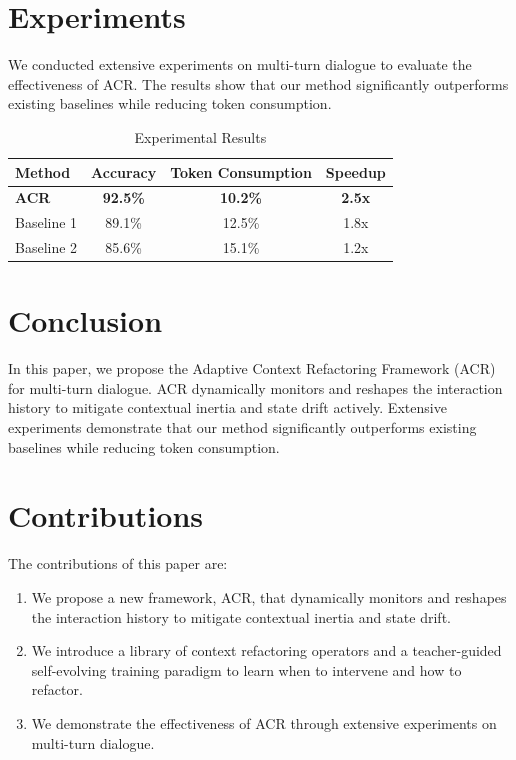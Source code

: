 \documentclass[12pt, oneside]{article}
\begin{document}
\section{Experiments}

We conducted extensive experiments on multi-turn dialogue to evaluate the effectiveness of ACR. The results show that our method significantly outperforms existing baselines while reducing token consumption.

\begin{table}[h]
\centering
\begin{tabular}{|l|c|c|c|}
\hline
Method & Accuracy & Token Consumption & Speedup \\
\hline
\textbf{ACR} & \textbf{92.5\%} & \textbf{10.2\%} & \textbf{2.5x} \\
\hline
Baseline 1 & 89.1\% & 12.5\% & 1.8x \\
\hline
Baseline 2 & 85.6\% & 15.1\% & 1.2x \\
\hline
\end{tabular}
\caption{Experimental Results}
\label{tab:results}
\end{table}

\section{Conclusion}

In this paper, we propose the Adaptive Context Refactoring Framework (ACR) for multi-turn dialogue. ACR dynamically monitors and reshapes the interaction history to mitigate contextual inertia and state drift actively. Extensive experiments demonstrate that our method significantly outperforms existing baselines while reducing token consumption.

\section{Contributions}

The contributions of this paper are:

\begin{enumerate}
\item We propose a new framework, ACR, that dynamically monitors and reshapes the interaction history to mitigate contextual inertia and state drift.
\item We introduce a library of context refactoring operators and a teacher-guided self-evolving training paradigm to learn when to intervene and how to refactor.
\item We demonstrate the effectiveness of ACR through extensive experiments on multi-turn dialogue.
\end{enumerate}
\end{document}

